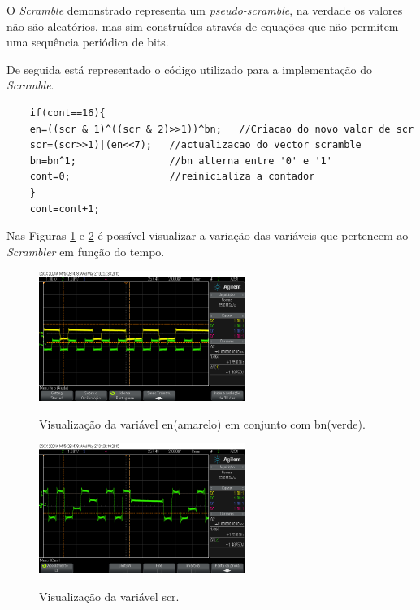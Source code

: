 \documentclass[11pt]{article}
\numberwithin{equation}{section}
\begin{document}
	O \textit{Scramble} demonstrado representa um \textit{pseudo-scramble}, na verdade os valores não são aleatórios, mas sim construídos através de equações que não permitem uma sequência periódica de bits.
	
	De seguida está representado o código utilizado para a implementação do \textit{Scramble}.
	
	\begin{lstlisting}
	if(cont==16){
	en=((scr & 1)^((scr & 2)>>1))^bn;   //Criacao do novo valor de scr
	scr=(scr>>1)|(en<<7);	//actualizacao do vector scramble
	bn=bn^1;				//bn alterna entre '0' e '1'
	cont=0;					//reinicializa a contador
	}
	cont=cont+1;
	\end{lstlisting}
	
	Nas Figuras \ref{fig:en_bn} e \ref{fig:scr} é possível visualizar a variação das variáveis que pertencem ao \textit{Scrambler} em função do tempo.
	
	\begin{figure}[H]
		\centering
		\includegraphics[width=0.6\textwidth]{./en_bn}~\\
		\caption{Visualização da variável en(amarelo) em conjunto com bn(verde).}
		\label{fig:en_bn}
	\end{figure}
	
	\begin{figure}[H]
		\centering
		\includegraphics[width=0.6\textwidth]{./scr}~\\
		\caption{Visualização da variável scr.}
		\label{fig:scr}
	\end{figure}
	
\end{document}
